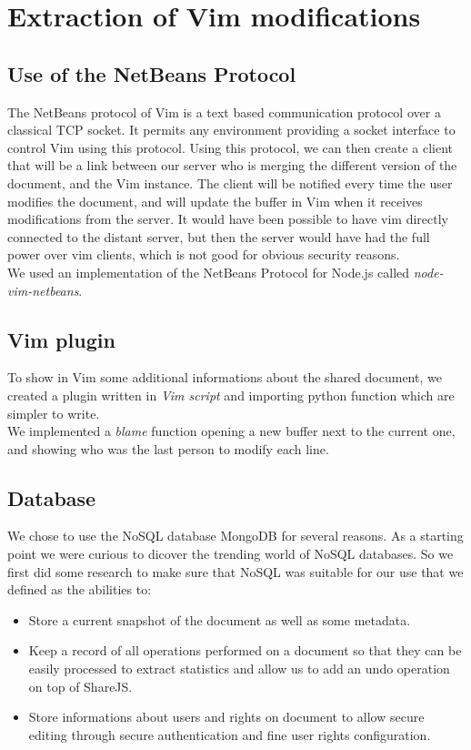 \documentclass{llncs}
\begin{document}
\section{Extraction of Vim modifications}\label{sec:Others}

\subsection{Use of the NetBeans Protocol}

The NetBeans protocol of Vim is a text based communication protocol over a
classical TCP socket.
It permits any environment providing a socket interface to control Vim using
this protocol.\cite{netbeans} Using this protocol, we can then create a client
that will be a link between our server who is merging the different version of
the document, and the Vim instance.
The client will be notified every time the user modifies the document, and will
update the buffer in Vim when it receives modifications from the server.
It would have been possible to have vim directly connected to the distant
server, but then the server would have had the full power over vim clients,
which is not good for obvious security reasons.\\
We used an implementation of the NetBeans Protocol for Node.js called
\textit{node-vim-netbeans}.\cite{node-vim-netbeans}

\subsection{Vim plugin}

To show in Vim some additional informations about the shared document, we
created a plugin written in \textit{Vim script} and importing python function
which are simpler to write.\\
We implemented a \textit{blame} function opening a new buffer next to the
current one, and showing who was the last person to modify each line.

\subsection{Database}

We chose to use the NoSQL database MongoDB for several reasons. As a starting
point we were curious to dicover the trending world of NoSQL databases. So we
first did some research to make sure that NoSQL was suitable for our use that we
defined as the abilities to:

\begin{itemize}
        \item Store a current snapshot of the document as well as some metadata.
        \item Keep a record of all operations performed on a document so that
            they can be easily processed to extract statistics and allow us to
            add an undo operation on top of ShareJS.
        \item Store informations about users and rights on document to allow
            secure editing through secure authentication and fine user rights
            configuration.
\end{itemize}
\end{document}
